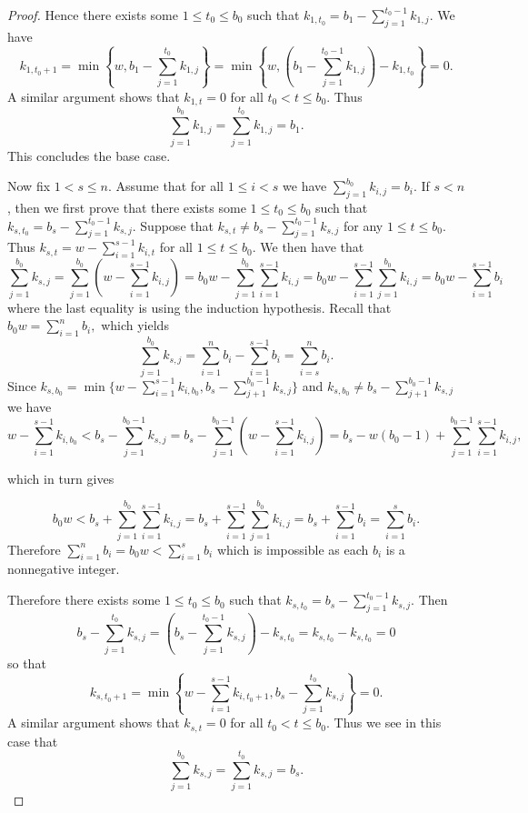 \documentclass [12pt,a4paper,reqno]{amsart}
\theoremstyle{plain}
\theoremstyle{definition}
\newtheorem{Assumptions and Discussion}[Theorem]{Assumptions and Discussion}
\theoremstyle{remark}
\begin{document}
\begin{proof}
Hence there exists some $1 \leq t_0 \leq b_0$ such that $k_{1,t_0} = b_1 - \sum_{j = 1}^{t_0-1} k_{1,j}$. We have 
\[
k_{1, t_0+1} = \min\left\{w, b_1-\sum_{j = 1}^{t_0}k_{1,j}\right\}
    = \min\left\{w, \left(b_1-\sum_{j = 1}^{t_0-1}k_{1,j}\right)-k_{1,t_0}\right\}
    =0.
\]
A similar argument shows that $k_{1,t} = 0$ for all $t_0 <t\leq b_0$.  Thus
\[
\sum_{j = 1}^{b_0} k_{1,j} = \sum_{j=1}^{t_0}k_{1,j}=b_1.
\] 
This concludes the base case.  


Now fix $1<s\leq n$.  Assume that for all $1 \leq i <s$ we have $\sum_{j=1}^{b_0} k_{i,j}= b_i$.  If $s<n$, then we first prove that there exists some $1 \leq t_0 \leq b_0$ such that $k_{s,t_0} = b_s - \sum_{j = 1}^{t_0-1} k_{s,j}$. Suppose that $k_{s,t} \neq b_s - \sum_{j=1}^{t_0-1} k_{s,j}$ for any $1 \leq t \leq b_0$.  Thus $k_{s,t} = w -\sum_{i=1}^{s-1} k_{i,t}$ for all $1 \leq t \leq b_0$.  We then have that
\[
\sum_{j=1}^{b_0} k_{s,j} = \sum_{j=1}^{b_0}\left ( w - \sum_{i=1}^{s-1} k_{i,j}\right )
    = b_0w - \sum_{j=1}^{b_0}\sum_{i=1}^{s-1}k_{i,j}
    = b_0w - \sum_{i=1}^{s-1}\sum_{j=1}^{b_0} k_{i,j}
    = b_0w - \sum_{i = 1}^{s-1} b_i
\]
where the last equality is using the induction hypothesis. Recall that $b_0w=\sum_{i=1}^nb_i,$ which yields
\[
   \sum_{j=1}^{b_0}k_{s,j} = \sum_{i=1}^n b_i - \sum_{i=1}^{s-1} b_i= \sum_{i=s}^n b_i.
\]
Since $k_{s,b_0} = \min\{w-\sum_{i = 1}^{s-1} k_{i, b_0}, b_s - \sum_{j+1}^{b_0-1} k_{s,j}\}$ and $k_{s,b_0} \neq b_s - \sum_{j+1}^{b_0-1} k_{s,j}$ we have
\[
w - \sum_{i=1}^{s-1} k_{i,b_0} < b_s - \sum_{j=1}^{b_0-1} k_{s,j}
    = b_s - \sum_{j=1}^{b_0-1}\left (w - \sum_{i=1}^{s-1}k_{i,j} \right )
    = b_s - w(b_0-1)+\sum_{j=1}^{b_0-1}\sum_{i=1}^{s-1} k_{i,j},
\]

which in turn gives

\[
b_0w < b_s+\sum_{j=1}^{b_0}\sum_{i=1}^{s-1} k_{i,j}
    = b_s + \sum_{i=1}^{s-1}\sum_{j=1}^{b_0} k_{i,j}
    = b_s +\sum_{i=1}^{s-1}b_i = \sum_{i=1}^s b_i.
\]
Therefore $\sum_{i=1}^n b_i = b_0w <\sum_{i=1}^s b_i$ which is impossible as each $b_i$ is a nonnegative integer.

Therefore there exists some $1 \leq t_0 \leq b_0$ such that $k_{s,t_0} = b_s - \sum_{j=1}^{t_0-1} k_{s,j}$. Then 
\[
b_s-\sum_{j = 1}^{t_0}k_{s,j}=\left(b_s-\sum_{j = 1}^{t_0-1}k_{s,j}\right)-k_{s,t_0}=k_{s, t_0}-k_{s,t_0}=0
\]
so that 
\[
k_{s, t_0+1} = \min\left\{w-\sum_{i=1}^{s-1}k_{i, t_0+1}, b_s-\sum_{j = 1}^{t_0}k_{s,j}\right\}=0.
\]
A similar argument shows that $k_{s,t} = 0$ for all $t_0 <t\leq b_0$. Thus we see in this case that 
\[
\sum_{j=1}^{b_0}k_{s,j}=\sum_{j=1}^{t_0}k_{s,j}=b_s.
\]


\end{proof}
\end{document}
